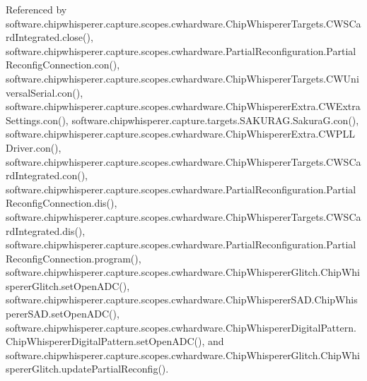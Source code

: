 Referenced by software.\+chipwhisperer.\+capture.\+scopes.\+cwhardware.\+Chip\+Whisperer\+Targets.\+C\+W\+S\+Card\+Integrated.\+close(), software.\+chipwhisperer.\+capture.\+scopes.\+cwhardware.\+Partial\+Reconfiguration.\+Partial\+Reconfig\+Connection.\+con(), software.\+chipwhisperer.\+capture.\+scopes.\+cwhardware.\+Chip\+Whisperer\+Targets.\+C\+W\+Universal\+Serial.\+con(), software.\+chipwhisperer.\+capture.\+scopes.\+cwhardware.\+Chip\+Whisperer\+Extra.\+C\+W\+Extra\+Settings.\+con(), software.\+chipwhisperer.\+capture.\+targets.\+S\+A\+K\+U\+R\+A\+G.\+Sakura\+G.\+con(), software.\+chipwhisperer.\+capture.\+scopes.\+cwhardware.\+Chip\+Whisperer\+Extra.\+C\+W\+P\+L\+L\+Driver.\+con(), software.\+chipwhisperer.\+capture.\+scopes.\+cwhardware.\+Chip\+Whisperer\+Targets.\+C\+W\+S\+Card\+Integrated.\+con(), software.\+chipwhisperer.\+capture.\+scopes.\+cwhardware.\+Partial\+Reconfiguration.\+Partial\+Reconfig\+Connection.\+dis(), software.\+chipwhisperer.\+capture.\+scopes.\+cwhardware.\+Chip\+Whisperer\+Targets.\+C\+W\+S\+Card\+Integrated.\+dis(), software.\+chipwhisperer.\+capture.\+scopes.\+cwhardware.\+Partial\+Reconfiguration.\+Partial\+Reconfig\+Connection.\+program(), software.\+chipwhisperer.\+capture.\+scopes.\+cwhardware.\+Chip\+Whisperer\+Glitch.\+Chip\+Whisperer\+Glitch.\+set\+Open\+A\+D\+C(), software.\+chipwhisperer.\+capture.\+scopes.\+cwhardware.\+Chip\+Whisperer\+S\+A\+D.\+Chip\+Whisperer\+S\+A\+D.\+set\+Open\+A\+D\+C(), software.\+chipwhisperer.\+capture.\+scopes.\+cwhardware.\+Chip\+Whisperer\+Digital\+Pattern.\+Chip\+Whisperer\+Digital\+Pattern.\+set\+Open\+A\+D\+C(), and software.\+chipwhisperer.\+capture.\+scopes.\+cwhardware.\+Chip\+Whisperer\+Glitch.\+Chip\+Whisperer\+Glitch.\+update\+Partial\+Reconfig().

\hypertarget{classsoftware_1_1chipwhisperer_1_1capture_1_1scopes_1_1cwhardware_1_1ChipWhispererDigitalPattern_1_1ChipWhispererDigitalPattern_a5b896f5498ebe6624fe774289c201ccf}{}
